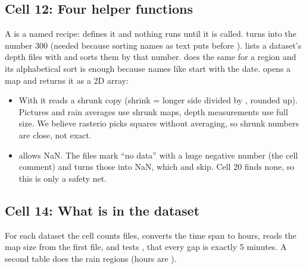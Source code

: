 \subsection{Cell 12: Four helper functions}
A  is a named recipe:  defines it and nothing runs until it is called.  turns  into the number 300 (needed because sorting names as text puts  before ).  lists a dataset's depth files with  and sorts them by that number.  does the same for a region and its alphabetical sort is enough because names like  start with the date.  opens a map and returns it as a 2D array:
\begin{itemize}
\item With  it reads a shrunk copy (shrink = longer side divided by , rounded up). Pictures and rain averages use shrunk maps, depth measurements use full size. We believe rasterio picks squares without averaging, so shrunk numbers are close, not exact.
\item {} allows NaN. The files mark ``no data'' with a huge negative number (the cell comment) and  turns those into NaN, which  and  skip. Cell 20 finds none, so this is only a safety net.
\end{itemize}

\subsection{Cell 14: What is in the dataset}
For each dataset the cell counts files, converts the time span to hours, reads the map size from the first file, and tests , that every gap is exactly 5 minutes. A second table does the rain regions (hours are ).

